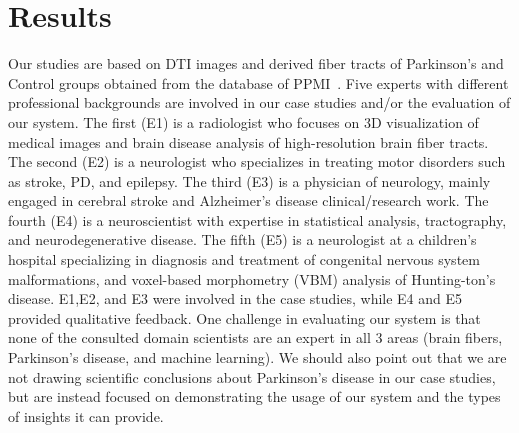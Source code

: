 
\section{Results}
\label{sec:cases}

\noindent %
Our studies are based on DTI images and %
derived fiber tracts of Parkinson's and Control groups obtained from the 
database of PPMI~\cite{marek2011parkinson}. Five experts with different professional backgrounds are involved in our case studies and/or the evaluation of our system. The first (E1) is a radiologist who focuses on 3D visualization of medical images and brain disease analysis of high-resolution brain fiber tracts. The second (E2) is a neurologist who specializes in treating motor disorders such as stroke, PD, and epilepsy. The third (E3) is a physician of neurology, mainly engaged in cerebral stroke and Alzheimer's disease clinical/research work. The fourth (E4) is a neuroscientist with expertise in statistical analysis, tractography, and neurodegenerative disease. The fifth (E5) is a neurologist at a children’s hospital specializing in diagnosis and treatment of congenital nervous system malformations, and voxel-based morphometry (VBM) analysis of Hunting-ton’s disease. E1,E2, and E3 were involved in the case studies, while E4 and E5 provided qualitative feedback. One challenge in evaluating our system is that none of the consulted domain scientists are an expert in all 3 areas (brain fibers, Parkinson's disease, and machine learning). We should also point out that we are not drawing scientific conclusions about Parkinson's disease in our case studies, but are instead focused on demonstrating the usage of our system and the types of insights it can provide.




